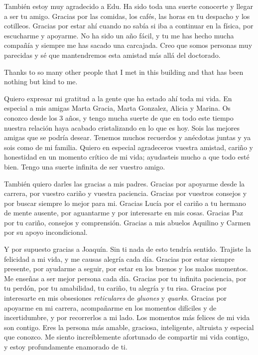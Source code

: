 También estoy muy agradecido a Edu. Ha sido toda una suerte conocerte y llegar a ser tu amigo. Gracias por las comidas, los cafés, las horas en tu despacho y los cotilleos. Gracias por estar ahí cuando no sabía si iba a continuar en la física, por escucharme y apoyarme. No ha sido un año fácil, y tu me has hecho mucha compañía y siempre me has sacado una carcajada. Creo que somos personas muy parecidas y sé que mantendremos esta amistad más allá del doctorado.

Thanks to so many other people that I met in this building and that has been nothing but kind to me. 

Quiero expresar mi gratitud a la gente que ha estado ahí toda mi vida. En especial a mis amigas Marta Gracia, Marta Gonzalez, Alicia y Marina. Os conozco desde los 3 años, y tengo mucha suerte de que en todo este tiempo nuestra relación haya acabado cristalizando en lo que es hoy. Sois las mejores amigas que se podría desear. Tenemos muchos recuerdos y anécdotas juntas y ya sois como de mi familia. Quiero en especial agradeceros vuestra amistad, cariño y honestidad en un momento crítico de mi vida; ayudasteis mucho a que todo esté bien. Tengo una suerte infinita de ser vuestro amigo.

También quiero darles las gracias a mis padres. Gracias por apoyarme desde la carrera, por vuestro cariño y vuestra paciencia. Gracias por vuestros consejos y por buscar siempre lo mejor para mi. Gracias Lucía por el cariño a tu hermano de mente ausente, por aguantarme y por interesarte en mis cosas. Gracias Paz por tu cariño, consejos y comprensión. Gracias a mis abuelos Aquilino y Carmen por su apoyo incondicional. 

Y por supuesto gracias a Joaquín. Sin ti nada de esto tendría sentido. Trajiste la felicidad a mi vida, y me causas alegría cada día. Gracias por estar siempre presente, por ayudarme a seguir, por estar en los buenos y los malos momentos. Me enseñas a ser mejor persona cada día. Gracias por tu infinita paciencia, por tu perdón, por tu amabilidad, tu cariño, tu alegría y tu risa. Gracias por interesarte en mis obsesiones \textit{reticulares} de \textit{gluones} y \textit{quarks}. Gracias por apoyarme en mi carrera, acompañarme en los momentos difíciles y de incertidumbre, y por recorrerlos a mi lado. Los momentos más felices de mi vida son contigo. Eres la persona más amable, graciosa, inteligente, altruista y especial que conozco. Me siento increíblemente afortunado de compartir mi vida contigo, y estoy profundamente enamorado de ti.

